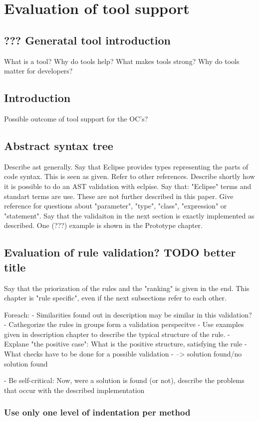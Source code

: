 \chapter{Evaluation of tool support}
\section{??? Generatal tool introduction}
What is a tool? Why do tools help? What makes tools strong? Why do tools matter for developers?
\section{Introduction}
Possible outcome of tool support for the OC's?
\section{Abstract syntax tree}
Describe ast generally. Say that Eclipse provides types representing the parts of code syntax. This is seen as given. 
Refer to other references.
Describe shortly how it is possible to do an AST validation with eclpise. Say that: "Eclipse" terms and standart terms are use. These are not further described in this paper. Give reference for questions about "parameter", "type", "class", "expression" or "statement".
Say that the validaiton in the next section is exactly implemented as described. One (???) example is shown in the Prototype chapter.
\section{Evaluation of rule validation? TODO better title}
Say that the priorization of the rules and the "ranking" is given in the end. This chapter is "rule specific", even if the next subsections refer to each other.

Foreach: 
 - Similarities found out in description may be similar in this validation?
 - Cathegorize the rules in groups form a validation perspecitve
 - Use examples given in description chapter to describe the typical structure of the rule. 
 - Explane "the positive case": What is the positive structure, satisfying the rule
 - What checks have to be done for a possible validation
 - --> solution found/no solution found
 
 - Be self-critical: Now, were a solution is found (or not), describe the problems that occur with the described implementation
\subsection{Use only one level of indentation per method}
